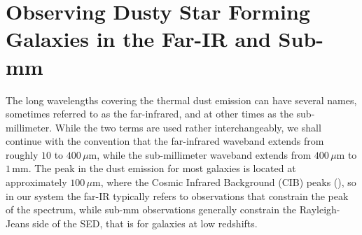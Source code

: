 \section{Observing Dusty Star Forming Galaxies in the Far-IR and Sub-mm}

The long wavelengths covering the thermal dust emission can have several names, sometimes referred to as the far-infrared, and at other times as the sub-millimeter. While the two terms are used rather interchangeably, we shall continue with the convention that the far-infrared waveband extends from roughly $10$ to $400\,\mu$m, while the sub-millimeter waveband extends from $400\,\mu$m to $1\,$mm. The peak in the dust emission for most galaxies is located at approximately $100\,\mu$m, where the Cosmic Infrared Background (CIB) peaks (\citealt{Yan_2022}), so in our system the far-IR typically refers to observations that constrain the peak of the spectrum, while sub-mm observations generally constrain the Rayleigh-Jeans side of the SED, that is for galaxies at low redshifts.

